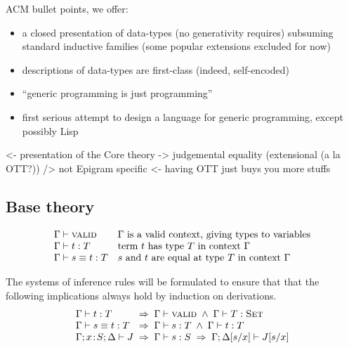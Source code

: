 \documentclass[preprint, authoryear]{sigplanconf}
\newenvironment{structure}{\footnotesize\verbatim}{\endverbatim}
\begin{document}
ACM bullet points, we offer:
\begin{itemize}
\item a closed presentation of data-types (no generativity requires)
  subsuming standard inductive families (some popular extensions
  excluded for now)
\item descriptions of data-types are first-class (indeed,
  self-encoded)
\item ``generic programming is just programming''
\item first serious attempt to design a language for generic
  programming, except possibly Lisp
\end{itemize}

\begin{structure}
<- presentation of the Core theory
    -> judgemental equality (extensional (a la OTT?))
    /> not Epigram specific 
        <- having OTT just buys you more stuffs
\end{structure}

\newcommand{\Valid}{\textsc{valid}}
\newcommand{\Set}{\textsc{Set}}
\newcommand{\Type}[1]{{#1}:\Set}
\newcommand{\x}{x}
\newcommand{\bnd}[2]{{#1}\!:\!{#2}}
\newcommand{\xS}{\bnd{x}{S}}
\newcommand{\stkl}[1]{\begin{array}[b]{@{}l@{}}#1\end{array}}
\newcommand{\stkc}[1]{\begin{array}[b]{@{}c@{}}#1\end{array}}
\newcommand{\pr}[2]{\left[{#1},{#2}\right]}

\newcommand{\Prop}{\textsc{Prop}}
\newcommand{\prf}[1]{{:\!\!-}~#1}
\newcommand{\True}{\mathsf{TT}}


\subsection{Base theory}

\[
\begin{array}{ll}
\Gamma\vdash\Valid & \mbox{\(\Gamma\) is a valid context, giving types to
                    variables} \\
\Gamma\vdash t:T & \mbox{term \(t\) has type \(T\) in context \(\Gamma\)} \\
\Gamma\vdash s\equiv t : T & \mbox{\(s\) and \(t\) are equal at type \(T\)
   in context \(\Gamma\)} \\
\end{array}
\]

The systems of inference rules will be formulated to ensure that that the
following implications always hold by induction on derivations.
\[\begin{array}{l@{\;\;\Rightarrow\;\;}l}
\Gamma\vdash t:T & \Gamma\vdash\Valid \;\wedge\; \Gamma\vdash\Type{T} \\
\Gamma\vdash s\equiv t:T & \Gamma\vdash s:T \;\wedge\; \Gamma\vdash t:T \\
\Gamma;\xS;\Delta \vdash J &
  \Gamma\vdash s:S \;\Rightarrow\; \Gamma;\Delta[s/x] \vdash J[s/x] \\
\end{array}\]
\end{document}
